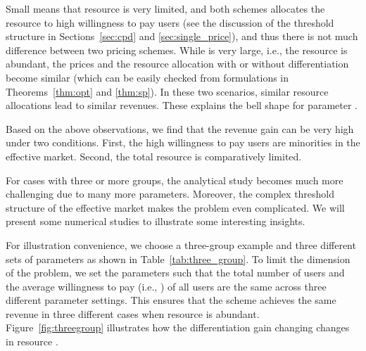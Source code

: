 \documentclass[twocolumn,10pt,twosided]{IEEEtran}
\begin{document}
Small  means that resource is very limited, and both schemes allocates the resource to high willingness to pay users (see the discussion of the threshold structure in Sections~\ref{sec:cpd} and \ref{sec:single_price}), and thus there is not much difference between two pricing schemes.
While  is very large, i.e., the resource is abundant, the prices and the resource allocation with or without differentiation become similar (which can be easily checked from formulations in Theorems~\ref{thm:opt} and \ref{thm:sp}).
In these two scenarios, similar resource allocations lead to similar revenues. These explains the bell shape for parameter .


Based on the above observations, we find that the revenue gain can be very high under two conditions. First, the high willingness to pay users are minorities in the effective market. Second, the total resource is comparatively limited.

For cases with three or more groups, the analytical study becomes much more challenging  due to many more parameters.  Moreover, the complex threshold structure of the effective market makes the problem even complicated. We will present some numerical studies to illustrate some interesting insights.

For illustration  convenience, we choose a three-group example and three different sets of parameters as shown in Table~\ref{tab:three_group}. To limit the dimension of the problem, we set the parameters such that the total number of users and the average willingness to pay (i.e., ) of all users are the same across three different parameter settings. This ensures that the  scheme achieves the same revenue in three different cases when resource is abundant. Figure~\ref{fig:threegroup} illustrates how the  differentiation gain changing changes in  resource .
\end{document}
